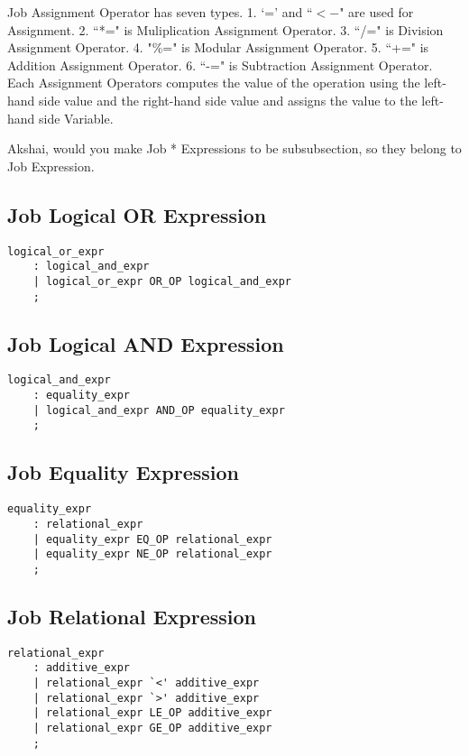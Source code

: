 \documentclass[prodmode,acmtecs]{acmsmall}
\begin{document}
Job Assignment Operator has seven types.  1. `=' and ``$<-$" are used
for Assignment.  2. ``*=" is Muliplication Assignment Operator.  3. 
``/=" is Division Assignment Operator.  4. "\%=" is Modular Assignment
Operator.  5. ``+=" is Addition Assignment Operator.  6. ``-=" is
Subtraction Assignment Operator.  Each Assignment Operators computes
the value of the operation using the left-hand side value and the
right-hand side value and assigns the value to the left-hand side
Variable.


Akshai, would you make Job * Expressions to be subsubsection, so they belong to Job Expression.
\subsection{Job Logical OR Expression}

\begin{lstlisting}
logical_or_expr
	: logical_and_expr
	| logical_or_expr OR_OP logical_and_expr
	;
\end{lstlisting}

\subsection{Job Logical AND Expression}

\begin{lstlisting}
logical_and_expr
	: equality_expr
	| logical_and_expr AND_OP equality_expr
	;
\end{lstlisting}

\subsection{Job Equality Expression}

\begin{lstlisting}
equality_expr
	: relational_expr
	| equality_expr EQ_OP relational_expr
	| equality_expr NE_OP relational_expr
	;
\end{lstlisting}

\subsection{Job Relational Expression}

\begin{lstlisting}
relational_expr
	: additive_expr
	| relational_expr `<' additive_expr
	| relational_expr `>' additive_expr
	| relational_expr LE_OP additive_expr
	| relational_expr GE_OP additive_expr
	;
\end{lstlisting}
\end{document}

